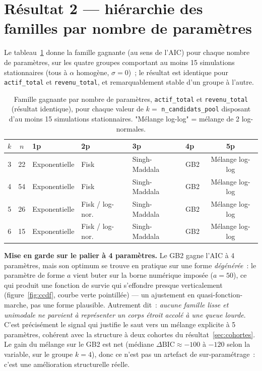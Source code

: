 \documentclass[11pt,a4paper]{article}
\begin{document}
\section{Résultat 2 --- hiérarchie des familles par nombre de paramètres}

Le tableau~\ref{tab:hierarchie} donne la famille gagnante (au sens de
l'AIC) pour chaque nombre de paramètres, sur les quatre groupes
comportant au moins 15 simulations stationnaires (tous à $\alpha$
homogène, $\sigma=0$)~; le résultat est identique pour
\texttt{actif\_total} et \texttt{revenu\_total}, et remarquablement stable
d'un groupe à l'autre.

\begin{table}[H]
\centering
\small
\begin{tabular}{ccllllc}
\toprule
$k$ & $n$ & 1p & 2p & 3p & 4p & 5p \\
\midrule
3 & 22 & Exponentielle & Fisk & Singh-Maddala & GB2 & Mélange log-log \\
4 & 54 & Exponentielle & Fisk & Singh-Maddala & GB2 & Mélange log-log \\
5 & 26 & Exponentielle & Fisk / log-nor. & Singh-Maddala & GB2 & Mélange log-log \\
6 & 15 & Exponentielle & Fisk / log-nor. & Singh-Maddala & GB2 & Mélange log-log \\
\bottomrule
\end{tabular}
\caption{Famille gagnante par nombre de paramètres, \texttt{actif\_total}
et \texttt{revenu\_total} (résultat identique), pour chaque valeur de $k=$
\texttt{n\_candidats\_pool} disposant d'au moins 15 simulations
stationnaires. "Mélange log-log" = mélange de 2 log-normales.}
\label{tab:hierarchie}
\end{table}

\textbf{Mise en garde sur le palier à 4 paramètres.} Le GB2 gagne l'AIC à
4 paramètres, mais son optimum se trouve en pratique sur une forme
\emph{dégénérée}~: le paramètre de forme $a$ vient buter sur la borne
numérique imposée ($a=50$), ce qui produit une fonction de survie qui
s'effondre presque verticalement (figure~\ref{fig:ccdf}, courbe verte
pointillée) --- un ajustement en quasi-fonction-marche, pas une forme
plausible. Autrement dit~: \emph{aucune famille lisse et unimodale ne
parvient à représenter un corps étroit accolé à une queue lourde}. C'est
précisément le signal qui justifie le saut vers un mélange explicite à 5
paramètres, cohérent avec la structure à deux cohortes du
résultat~\ref{sec:cohortes}. Le gain du mélange sur le GB2 est net
(médiane $\Delta\mathrm{BIC} \approx -100$ à $-120$ selon la variable, sur
le groupe $k=4$), donc ce n'est pas un artefact de sur-paramétrage~: c'est
une amélioration structurelle réelle.
\end{document}
